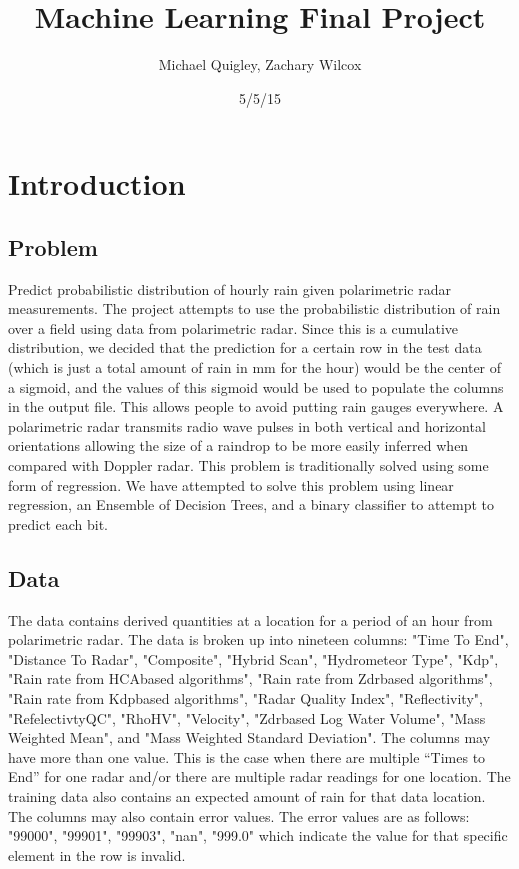 \documentclass[pdftex,a4paper,11pt]{article}
\title{Machine Learning Final Project}
\author{Michael Quigley, Zachary Wilcox}
\date{5/5/15}
\begin{document}
\maketitle
\section{Introduction}
\subsection{Problem}
Predict probabilistic distribution of hourly rain given polarimetric radar measurements.
The project attempts to use the probabilistic distribution of rain over a field using data from
polarimetric radar. Since this is a cumulative distribution, we decided that the prediction for a certain row in the test data (which is just a total amount of rain in mm for the hour) would be the center of a sigmoid, and the values of this sigmoid would be used to populate the columns in the output file. This allows people to avoid putting rain gauges everywhere. A polarimetric
radar transmits radio wave pulses in both vertical and horizontal orientations allowing the size
of a raindrop to be more easily inferred when compared with Doppler radar.
This problem is traditionally solved using some form of regression.  We have attempted to solve this problem using linear regression, an Ensemble of Decision Trees, and a binary classifier to attempt to predict each bit.

\subsection{Data}
The data contains derived quantities at a location for a period of an hour from polarimetric
radar. The data is broken up into nineteen columns: "Time To End", "Distance To Radar",
"Composite", "Hybrid Scan", "Hydrometeor Type", "Kdp", "Rain rate from HCAbased
algorithms", "Rain rate from Zdrbased
algorithms", "Rain rate from Kdpbased
algorithms",
"Radar Quality Index", "Reflectivity", "RefelectivtyQC", "RhoHV", "Velocity", "Zdrbased
Log
Water Volume", "Mass Weighted Mean", and "Mass Weighted Standard Deviation".
The columns may have more than one value. This is the case when there are multiple “Times
to End” for one radar and/or there are multiple radar readings for one location. The training
data also contains an expected amount of rain for that data location. The columns may also
contain error values. The error values are as follows: "99000",
"99901",
"99903",
"nan",
"999.0" which indicate the value for that specific element in the row is invalid.
\end{document}
